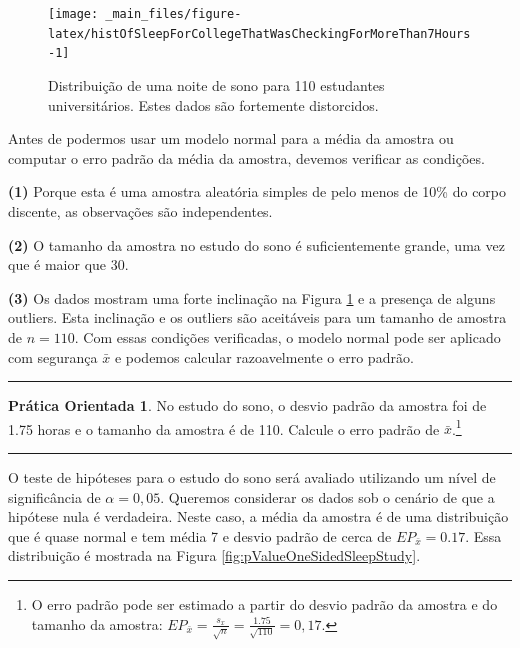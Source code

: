 \documentclass[
]{book}
\theoremstyle{definition}
\theoremstyle{definition}
\theoremstyle{definition}
\newtheorem{exercise}{Prática Orientada}[chapter]
\theoremstyle{definition}
\theoremstyle{remark}
\begin{document}
\begin{figure}

{\centering \texttt{[image: \_main\_files/figure-latex/histOfSleepForCollegeThatWasCheckingForMoreThan7Hours-1]} 

}

\caption{Distribuição de uma noite de sono para 110 estudantes universitários. Estes dados são fortemente distorcidos.}\label{fig:histOfSleepForCollegeThatWasCheckingForMoreThan7Hours}
\end{figure}

Antes de podermos usar um modelo normal para a média da amostra ou computar o erro padrão da média da amostra, devemos verificar as condições.

\textbf{(1)} Porque esta é uma amostra aleatória simples de pelo menos de 10\% do corpo discente, as observações são independentes.

\textbf{(2)} O tamanho da amostra no estudo do sono é suficientemente grande, uma vez que é maior que 30.

\textbf{(3)} Os dados mostram uma forte inclinação na Figura \ref{fig:histOfSleepForCollegeThatWasCheckingForMoreThan7Hours} e a presença de alguns outliers. Esta inclinação e os outliers são aceitáveis para um tamanho de amostra de \(n=110\). Com essas condições verificadas, o modelo normal pode ser aplicado com segurança \(\bar{x}\) e podemos calcular razoavelmente o erro padrão.

\begin{center}\rule{0.5\linewidth}{0.5pt}\end{center}

\begin{exercise}
\protect\hypertarget{exr:unnamed-chunk-164}{}{\label{exr:unnamed-chunk-164} }No estudo do sono, o desvio padrão da amostra foi de 1.75 horas e o tamanho da amostra é de 110. Calcule o erro padrão de \(\bar{x}\).\footnote{O erro padrão pode ser estimado a partir do desvio padrão da amostra e do tamanho da amostra: \(EP_{\bar{x}} = \frac{s_x}{\sqrt{n}} = \frac{1.75}{\sqrt{110}} = 0,17\).}
\end{exercise}

\begin{center}\rule{0.5\linewidth}{0.5pt}\end{center}

O teste de hipóteses para o estudo do sono será avaliado utilizando um nível de significância de \(\alpha = 0,05\). Queremos considerar os dados sob o cenário de que a hipótese nula é verdadeira. Neste caso, a média da amostra é de uma distribuição que é quase normal e tem média 7 e desvio padrão de cerca de \(EP_{\bar{x}} = 0.17\). Essa distribuição é mostrada na Figura \ref{fig:pValueOneSidedSleepStudy}.
\end{document}
